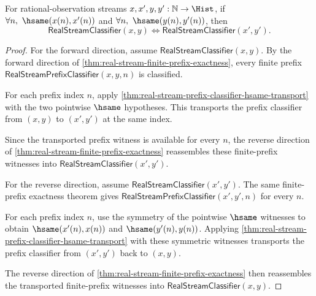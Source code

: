 \begin{theorem}
\label{thm:real-stream-classifier-hsame-transport}
For rational-observation streams $x,x',y,y':\mathbb{N}\to\Hist$, if
$\forall n,\ \hsame(x(n),x'(n))$ and
$\forall n,\ \hsame(y(n),y'(n))$, then
$$
\mathsf{RealStreamClassifier}(x,y)
\Longleftrightarrow
\mathsf{RealStreamClassifier}(x',y').
$$
\end{theorem}
\begin{proof}
For the forward direction, assume $\mathsf{RealStreamClassifier}(x,y)$. By the
forward direction of \autoref{thm:real-stream-finite-prefix-exactness}, every
finite prefix $\mathsf{RealStreamPrefixClassifier}(x,y,n)$ is classified.

For each prefix index $n$, apply
\autoref{thm:real-stream-prefix-classifier-hsame-transport} with the two
pointwise $\hsame$ hypotheses. This transports the prefix classifier from
$(x,y)$ to $(x',y')$ at the same index.

Since the transported prefix witness is available for every $n$, the reverse
direction of \autoref{thm:real-stream-finite-prefix-exactness} reassembles
these finite-prefix witnesses into
$\mathsf{RealStreamClassifier}(x',y')$.

For the reverse direction, assume $\mathsf{RealStreamClassifier}(x',y')$. The
same finite-prefix exactness theorem gives
$\mathsf{RealStreamPrefixClassifier}(x',y',n)$ for every $n$.

For each prefix index $n$, use the symmetry of the pointwise $\hsame$
witnesses to obtain $\hsame(x'(n),x(n))$ and $\hsame(y'(n),y(n))$. Applying
\autoref{thm:real-stream-prefix-classifier-hsame-transport} with these
symmetric witnesses transports the prefix classifier from $(x',y')$ back to
$(x,y)$.

The reverse direction of \autoref{thm:real-stream-finite-prefix-exactness}
then reassembles the transported finite-prefix witnesses into
$\mathsf{RealStreamClassifier}(x,y)$.
\end{proof}
